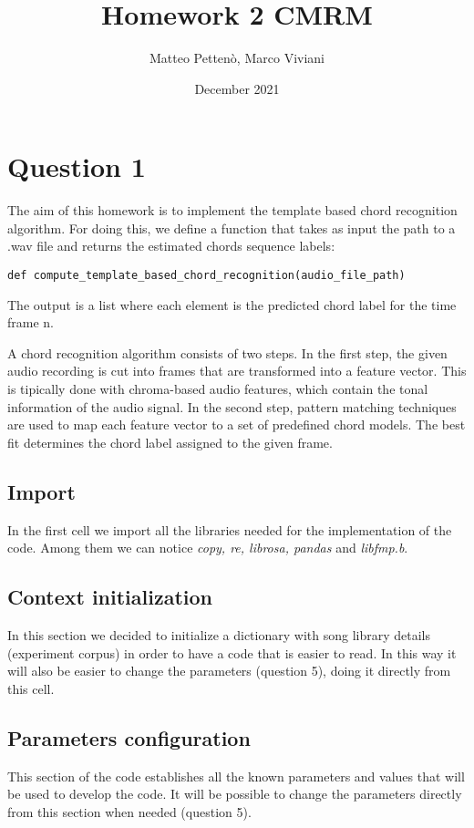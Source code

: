 \documentclass{article}
\title{Homework 2 CMRM}
\author{Matteo Pettenò, Marco Viviani}
\date{December 2021}
\begin{document}
\maketitle

\section{Question 1 }


The aim of this homework is to implement the template based chord recognition algorithm. For doing this, we define a function that takes as input the path to a .wav file and returns the estimated chords sequence labels:

\begin{lstlisting}
def compute_template_based_chord_recognition(audio_file_path)
\end{lstlisting}


The output is a list where each element is the predicted chord label for the time frame n. 

A chord recognition algorithm consists of two steps. In the first step, the given audio recording is cut into frames that are transformed into a feature vector. This is tipically done with chroma-based audio features, which contain the tonal information of the audio signal. 
In the second step, pattern matching techniques are used to map each feature vector to a set of predefined chord models. The best fit determines the chord label assigned to the given frame. \\


\subsection{Import}
In the first cell we import all the libraries needed for the implementation of the code. Among them we can notice \textit{copy, re, librosa, pandas} and \textit{libfmp.b}.

\subsection{Context initialization}
In this section we decided to initialize a dictionary with song library details (experiment corpus) in order to have a code that is easier to read. In this way it will also be easier to change the parameters (question 5), doing it directly from this cell.

\subsection{Parameters configuration}
This section of the code establishes all the known parameters and values that will be used to develop the code. It will be possible to change the parameters directly from this section when needed (question 5). 
\end{document}
